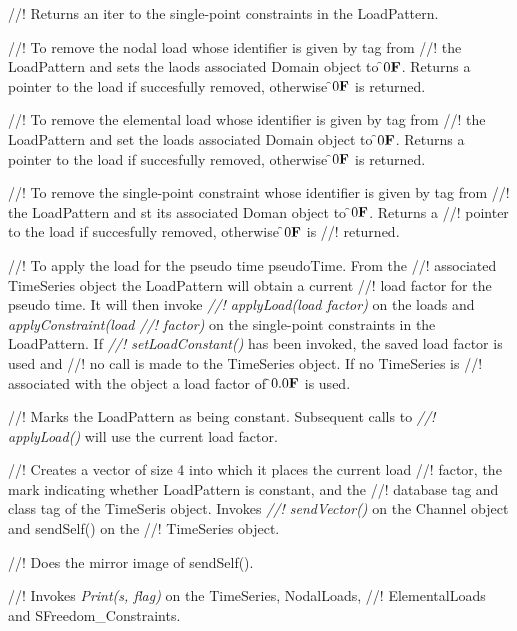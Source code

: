 //! Returns an iter to the single-point constraints in the LoadPattern.
    
//! To remove the nodal load whose identifier is given by \p tag from
//! the LoadPattern and sets the laods associated Domain object to
\f$0{\bf F}$. Returns a pointer to the load if succesfully removed, otherwise
\f$0{\bf F}$ is returned. 

//! To remove the elemental load whose identifier is given by \p tag from
//! the LoadPattern and set the loads associated Domain object to
\f$0{\bf F}$. Returns a pointer to the load if succesfully removed, otherwise
\f$0{\bf F}$ is returned. 

//! To remove the single-point constraint whose identifier is given by \p tag from
//! the LoadPattern and st its associated Doman object to \f$0{\bf F}$. Returns a
//! pointer to the load if succesfully removed, otherwise \f$0{\bf F}$ is
//! returned. 

//! To apply the load for the pseudo time \p pseudoTime. From the
//! associated TimeSeries object the LoadPattern will obtain a current
//! load factor for the pseudo time. It will then invoke {\em
//! applyLoad(load factor)} on the loads and {\em applyConstraint(load
//! factor)} on the single-point constraints in the LoadPattern. If {\em
//! setLoadConstant()} has been invoked, the saved load factor is used and
//! no call is made to the TimeSeries object. If no TimeSeries is
//! associated with the object a load factor of \f$0.0{\bf F}$ is used.

//! Marks the LoadPattern as being constant. Subsequent calls to {\em
//! applyLoad()} will use the current load factor.

//! Creates a vector of size 4 into which it places the current load
//! factor, the mark indicating whether LoadPattern is constant, and the
//! database tag and class tag of the TimeSeris object. Invokes {\em
//! sendVector()} on the Channel object and sendSelf() on the
//! TimeSeries object.

//! Does the mirror image of sendSelf().

//! Invokes {\em Print(s, flag)} on the TimeSeries, NodalLoads,
//! ElementalLoads and SFreedom\_Constraints. 
